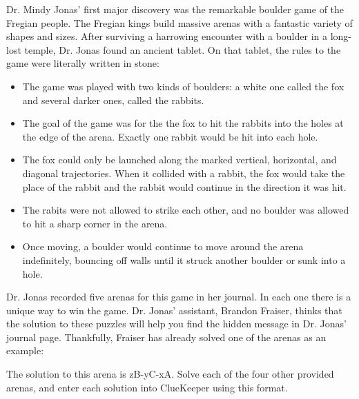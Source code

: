 Dr. Mindy Jonas' first major discovery was the remarkable boulder game of the Fregian people. The Fregian kings build massive arenas with a fantastic variety of shapes and sizes. After surviving a harrowing encounter with a boulder in a long-lost temple, Dr. Jonas found an ancient tablet. On that tablet, the rules to the game were literally written in stone:
\begin{itemize}
        \item The game was played with two kinds of boulders: a white one called the fox and several darker ones, called the rabbits.
        \item The goal of the game was for the the fox to hit the rabbits into the holes at the edge of the arena. Exactly one rabbit would be hit into each hole.
        \item The fox could only be launched along the marked vertical, horizontal, and diagonal trajectories. When it collided with a rabbit, the fox would take the place of the rabbit and the rabbit would continue in the direction it was hit.
        \item The rabits were not allowed to strike each other, and no boulder was allowed to hit a sharp corner in the arena.
        \item Once moving, a boulder would continue to move around the arena indefinitely, bouncing off walls until it struck another boulder or sunk into a hole.
\end{itemize}

Dr. Jonas recorded five arenas for this game in her journal. In each one there is a unique way to win the game. Dr. Jonas' assistant, Brandon Fraiser, thinks that the solution to these puzzles will help you find the hidden message in Dr. Jonas' journal page. Thankfully, Fraiser has already solved one of the arenas as an example:



The solution to this arena is zB-yC-xA. Solve each of the four other provided arenas, and enter each solution into ClueKeeper using this format.